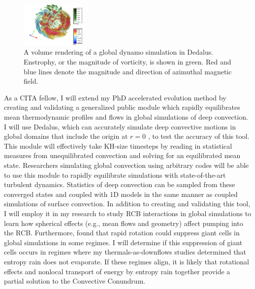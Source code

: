 \documentclass[preprint, hmargin=1in, vmargin=1in]{aastex62}
\begin{document}
\begin{figure}
	\begin{center}
	\vspace{-16pt}
    \includegraphics[width=0.28\textwidth]{./figs/mdwarf.png}
	\vspace{-16pt}
	\end{center}
    \caption{A volume rendering of a global dynamo simulation in Dedalus.
	Enstrophy, or the magnitude of vorticity, is shown in green.
	Red and blue lines denote the magnitude and direction of azimuthal magnetic field.
	\label{fig:mdwarf} }
	\vspace{-16pt}
\end{figure}
As a CITA fellow, I will extend my PhD accelerated evolution method \citep{anders&all2018} by creating and validating a generalized public module which rapidly equilibrates mean thermodynamic profiles and flows in global simulations of deep convection.
I will use Dedalus, which can accurately simulate deep convective motions in global domains that include the origin at $r = 0$ \citep[as visualized in Fig.~\ref{fig:mdwarf}, and tested in][]{lecoanet&all2019}, to test the accuracy of this tool.
This module will effectively take KH-size timesteps by reading in statistical measures from unequilibrated convection and solving for an equilibrated mean state.
Researchers simulating global convection using arbitrary codes will be able to use this module to rapidly equilibrate simulations with state-of-the-art turbulent dynamics.
Statistics of deep convection can be sampled from these converged states and coupled with 1D models in the same manner as \citet{jorgensen&weiss2019} coupled simulations of surface convection.
In addition to creating and validating this tool, I will employ it in my research to study RCB interactions in global simulations to learn how spherical effects (e.g., mean flows and geometry) affect pumping into the RCB.
Furthermore, \citet{featherstone&hindman2016} found that rapid rotation could suppress giant cells in global simulations in some regimes.
I will determine if this suppression of giant cells occurs in regimes where my thermals-as-downflows studies determined that entropy rain does not evaporate.
If these regimes align, it is likely that rotational effects and nonlocal transport of energy by entropy rain together provide a partial solution to the Convective Conundrum.
\end{document}
